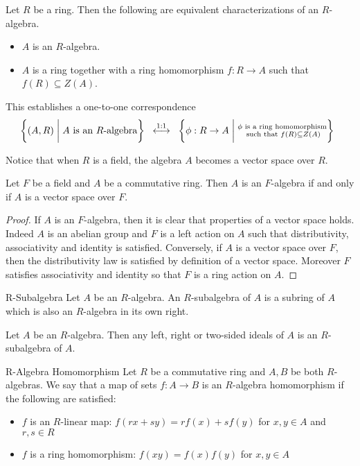 \documentclass[a4paper]{article}
\begin{document}
\begin{prp}{}{} Let $R$ be a ring. Then the following are equivalent characterizations of an $R$-algebra. 
\begin{itemize}
\item $A$ is an $R$-algebra. 
\item $A$ is a ring together with a ring homomorphism $f:R\to A$ such that $f(R)\subseteq Z(A)$. 
\end{itemize}
\end{prp}

This establishes a one-to-one correspondence $$\left\{(A,R)\;\bigg{|}\;A\text{ is an }R\text{-algebra}\right\}\;\;\overset{1:1}{\longleftrightarrow}\;\;\left\{\phi:R\to A\;\bigg{|}\;\substack{\phi\text{ is a ring homomorphism}\\\text{ such that }f(R)\subseteq Z(A)}\right\}\;\;$$

Notice that when $R$ is a field, the algebra $A$ becomes a vector space over $R$. 

\begin{lmm}{}{} Let $F$ be a field and $A$ be a commutative ring. Then $A$ is an $F$-algebra if and only if $A$ is a vector space over $F$. \tcbline
\begin{proof}
If $A$ is an $F$-algebra, then it is clear that properties of a vector space holds. Indeed $A$ is an abelian group and $F$ is a left action on $A$ such that distributivity, associativity and identity is satisfied. Conversely, if $A$ is a vector space over $F$, then the distributivity law is satisfied by definition of a vector space. Moreover $F$ satisfies associativity and identity so that $F$ is a ring action on $A$. 
\end{proof}
\end{lmm}

\begin{defn}{R-Subalgebra}{} Let $A$ be an $R$-algebra. An $R$-subalgebra of $A$ is a subring of $A$ which is also an $R$-algebra in its own right. 
\end{defn}

\begin{prp}{}{} Let $A$ be an $R$-algebra. Then any left, right or two-sided ideals of $A$ is an $R$-subalgebra of $A$. 
\end{prp}

\begin{defn}{R-Algebra Homomorphism}{} Let $R$ be a commutative ring and $A,B$ be both $R$-algebras. We say that a map of sets $f:A\to B$ is an $R$-algebra homomorphism if the following are satisfied: 
\begin{itemize}
\item $f$ is an $R$-linear map: $f(rx+sy)=rf(x)+sf(y)$ for $x,y\in A$ and $r,s\in R$
\item $f$ is a ring homomorphism: $f(xy)=f(x)f(y)$ for $x,y\in A$
\end{itemize}
\end{defn}
\end{document}
